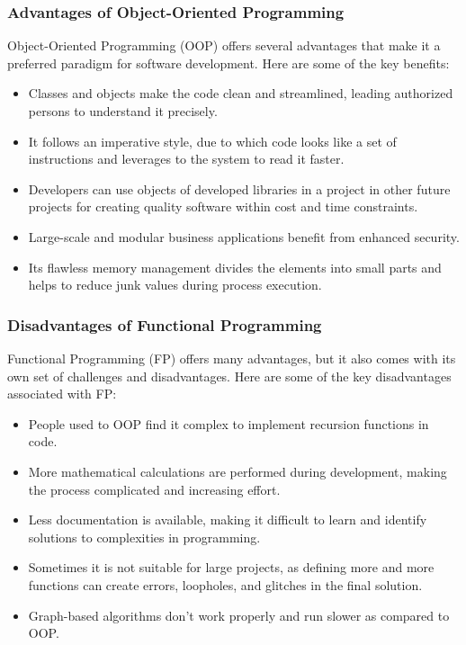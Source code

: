 \documentclass[12pt]{article}
\begin{document}
\subsubsection{Advantages of Object-Oriented Programming}
Object-Oriented Programming (OOP) offers several advantages that make it a preferred paradigm for software development. Here are some of the key benefits:

\begin{itemize}
    \item Classes and objects make the code clean and streamlined, leading authorized persons to understand it precisely.
    \item It follows an imperative style, due to which code looks like a set of instructions and leverages to the system to read it faster.
    \item Developers can use objects of developed libraries in a project in other future projects for creating quality software within cost and time constraints.
    \item Large-scale and modular business applications benefit from enhanced security.
    \item Its flawless memory management divides the elements into small parts and helps to reduce junk values during process execution.
\end{itemize}

\subsubsection{Disadvantages of Functional Programming}
Functional Programming (FP) offers many advantages, but it also comes with its own set of challenges and disadvantages. Here are some of the key disadvantages associated with FP:
\begin{itemize}
    \item People used to OOP find it complex to implement recursion functions in code.
    \item More mathematical calculations are performed during development, making the process complicated and increasing effort.
    \item Less documentation is available, making it difficult to learn and identify solutions to complexities in programming.
    \item Sometimes it is not suitable for large projects, as defining more and more functions can create errors, loopholes, and glitches in the final solution.
    \item Graph-based algorithms don’t work properly and run slower as compared to OOP.
\end{itemize}
\end{document}
